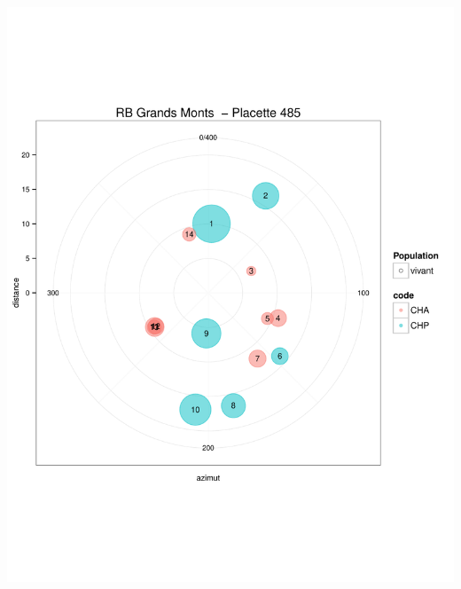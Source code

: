 \documentclass[a4paper]{book}\usepackage[]{graphicx}\usepackage[]{color}
\makeatletter
\def\maxwidth{ %
  \ifdim\Gin@nat@width>\linewidth
    \linewidth
  \else
    \Gin@nat@width
  \fi
}
\newenvironment{knitrout}{}{} %
\makeatother
\begin{document}
\begin{knitrout}
{\centering \includegraphics[width=\maxwidth]{Figures/PlanArbres-55} 

}





\end{knitrout}
\end{document}
